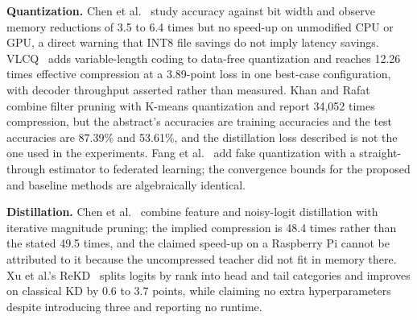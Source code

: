 \documentclass[oneside,a4paper,12pt]{report}
\begin{document}
\textbf{Quantization.} Chen et al.~\cite{chen2021} study accuracy against bit width and observe memory reductions of 3.5 to 6.4 times but no speed-up on unmodified CPU or GPU, a direct warning that INT8 file savings do not imply latency savings. VLCQ~\cite{abdelsalam2025} adds variable-length coding to data-free quantization and reaches 12.26 times effective compression at a 3.89-point loss in one best-case configuration, with decoder throughput asserted rather than measured. Khan and Rafat~\cite{khan2025} combine filter pruning with K-means quantization and report 34,052 times compression, but the abstract's accuracies are training accuracies and the test accuracies are 87.39\% and 53.61\%, and the distillation loss described is not the one used in the experiments. Fang et al.~\cite{fang2026} add fake quantization with a straight-through estimator to federated learning; the convergence bounds for the proposed and baseline methods are algebraically identical.

\textbf{Distillation.} Chen et al.~\cite{chen2020} combine feature and noisy-logit distillation with iterative magnitude pruning; the implied compression is 48.4 times rather than the stated 49.5 times, and the claimed speed-up on a Raspberry Pi cannot be attributed to it because the uncompressed teacher did not fit in memory there. Xu et al.'s ReKD~\cite{xu2024} splits logits by rank into head and tail categories and improves on classical KD by 0.6 to 3.7 points, while claiming no extra hyperparameters despite introducing three and reporting no runtime.
\end{document}
